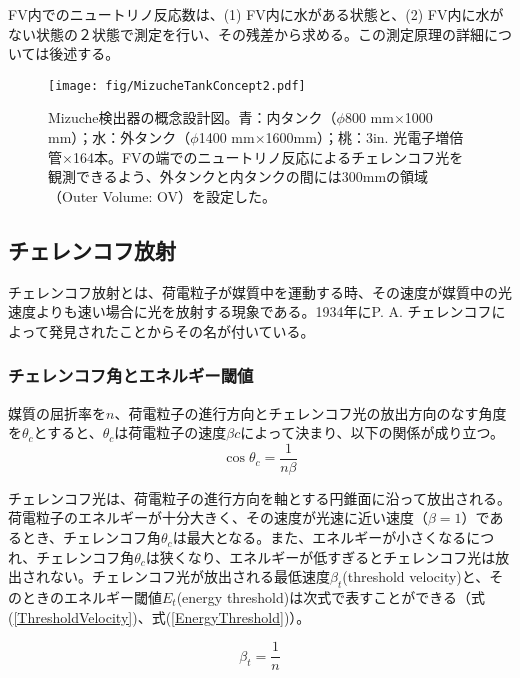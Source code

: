\documentclass[11pt]{ltjsreport}
\newcommand{\equref}[1]{式(\ref{#1})}
\begin{document}
FV内でのニュートリノ反応数は、(1) FV内に水がある状態と、(2) FV内に水がない状態の２状態で測定を行い、その残差から求める。この測定原理の詳細については後述する。

\begin{figure}[htb]
\centering
\texttt{[image: fig/MizucheTankConcept2.pdf]}
\caption[Mizuche検出器の概念設計図]{Mizuche検出器の概念設計図。青：内タンク（$\phi$800 mm$\times$1000 mm）；水：外タンク（$\phi$1400 mm$\times$1600mm）；桃：3in. 光電子増倍管$\times$164本。FVの端でのニュートリノ反応によるチェレンコフ光を観測できるよう、外タンクと内タンクの間には300mmの領域（Outer Volume: OV）を設定した。}
\label{TankConcept}
\end{figure}


\subsection{チェレンコフ放射}
チェレンコフ放射とは、荷電粒子が媒質中を運動する時、その速度が媒質中の光速度よりも速い場合に光を放射する現象である。1934年にP. A. チェレンコフによって発見されたことからその名が付いている。

\subsubsection{チェレンコフ角とエネルギー閾値}
媒質の屈折率を$n$、荷電粒子の進行方向とチェレンコフ光の放出方向のなす角度を$\theta_{c}$とすると、$\theta_{c}$は荷電粒子の速度$\beta c$によって決まり、以下の関係が成り立つ。%
\begin{equation}
\cos \theta_{c} = \frac{1}{n\beta}
\label{CherenkovAngle}
\end{equation}

チェレンコフ光は、荷電粒子の進行方向を軸とする円錐面に沿って放出される。荷電粒子のエネルギーが十分大きく、その速度が光速に近い速度（$\beta =1$）であるとき、チェレンコフ角$\theta_{c}$は最大となる。また、エネルギーが小さくなるにつれ、チェレンコフ角$\theta_{c}$は狭くなり、エネルギーが低すぎるとチェレンコフ光は放出されない。チェレンコフ光が放出される最低速度$\beta_{t}$(threshold velocity)と、そのときのエネルギー閾値$E_{t}$(energy threshold)は次式で表すことができる（\equref{ThresholdVelocity}、\equref{EnergyThreshold}）。

\begin{equation}
\beta_{t} = \frac{1}{n}
\label{ThresholdVelocity}
\end{equation}
\end{document}
